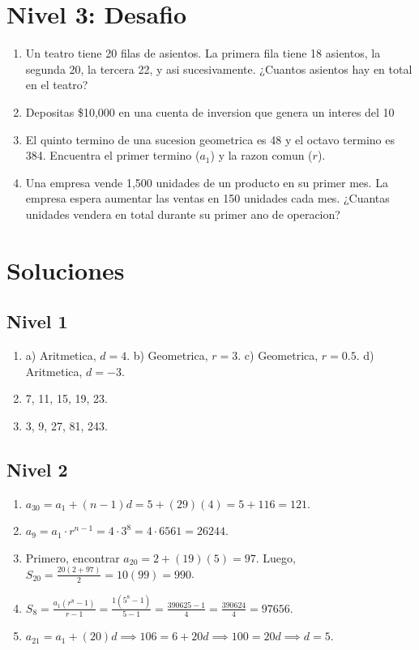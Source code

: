 \documentclass[12pt,a4paper]{article}
\begin{document}
\section*{Nivel 3: Desafio}
\begin{enumerate}
    \item Un teatro tiene 20 filas de asientos. La primera fila tiene 18 asientos, la segunda 20, la tercera 22, y asi sucesivamente. ¿Cuantos asientos hay en total en el teatro?
    \item Depositas \$10,000 en una cuenta de inversion que genera un interes del 10%
    \item El quinto termino de una sucesion geometrica es 48 y el octavo termino es 384. Encuentra el primer termino ($a_1$) y la razon comun ($r$).
    \item Una empresa vende 1,500 unidades de un producto en su primer mes. La empresa espera aumentar las ventas en 150 unidades cada mes. ¿Cuantas unidades vendera en total durante su primer ano de operacion?
\end{enumerate}

\newpage

\section*{Soluciones}

\subsection*{Nivel 1}
\begin{enumerate}
    \item a) Aritmetica, $d=4$. b) Geometrica, $r=3$. c) Geometrica, $r=0.5$. d) Aritmetica, $d=-3$.
    \item 7, 11, 15, 19, 23.
    \item 3, 9, 27, 81, 243.
\end{enumerate}

\subsection*{Nivel 2}
\begin{enumerate}
    \item $a_{30} = a_1 + (n-1)d = 5 + (29)(4) = 5 + 116 = 121$.
    \item $a_9 = a_1 \cdot r^{n-1} = 4 \cdot 3^8 = 4 \cdot 6561 = 26244$.
    \item Primero, encontrar $a_{20} = 2 + (19)(5) = 97$. Luego, $S_{20} = \frac{20(2+97)}{2} = 10(99) = 990$.
    \item $S_8 = \frac{a_1(r^8 - 1)}{r - 1} = \frac{1(5^8 - 1)}{5 - 1} = \frac{390625 - 1}{4} = \frac{390624}{4} = 97656$.
    \item $a_{21} = a_1 + (20)d \implies 106 = 6 + 20d \implies 100 = 20d \implies d=5$.
\end{enumerate}
\end{document}
